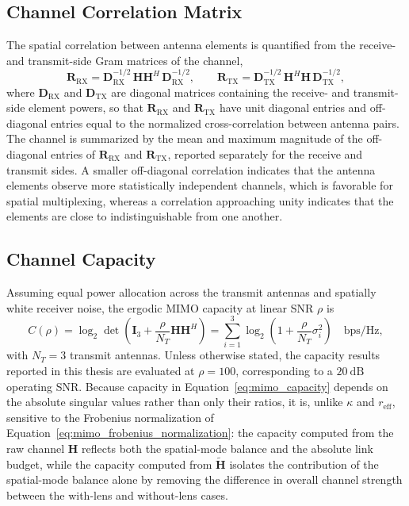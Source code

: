 \subsection{Channel Correlation Matrix}
The spatial correlation between antenna elements is quantified from the receive- and transmit-side Gram matrices of the channel,
\begin{equation}
    \mathbf{R}_{\mathrm{RX}} = \mathbf{D}_{\mathrm{RX}}^{-1/2}\,\mathbf{H}\mathbf{H}^{H}\,\mathbf{D}_{\mathrm{RX}}^{-1/2},
    \qquad
    \mathbf{R}_{\mathrm{TX}} = \mathbf{D}_{\mathrm{TX}}^{-1/2}\,\mathbf{H}^{H}\mathbf{H}\,\mathbf{D}_{\mathrm{TX}}^{-1/2},
    \label{eq:mimo_correlation_matrix}
\end{equation}
where $\mathbf{D}_{\mathrm{RX}}$ and $\mathbf{D}_{\mathrm{TX}}$ are diagonal matrices containing the receive- and transmit-side element powers, so that $\mathbf{R}_{\mathrm{RX}}$ and $\mathbf{R}_{\mathrm{TX}}$ have unit diagonal entries and off-diagonal entries equal to the normalized cross-correlation between antenna pairs. The channel is summarized by the mean and maximum magnitude of the off-diagonal entries of $\mathbf{R}_{\mathrm{RX}}$ and $\mathbf{R}_{\mathrm{TX}}$, reported separately for the receive and transmit sides. A smaller off-diagonal correlation indicates that the antenna elements observe more statistically independent channels, which is favorable for spatial multiplexing, whereas a correlation approaching unity indicates that the elements are close to indistinguishable from one another.

\subsection{Channel Capacity}
Assuming equal power allocation across the transmit antennas and spatially white receiver noise, the ergodic MIMO capacity at linear SNR $\rho$ is
\begin{equation}
    C(\rho) = \log_2\det\!\left(\mathbf{I}_{3} + \frac{\rho}{N_T}\mathbf{H}\mathbf{H}^{H}\right)
    = \sum_{i=1}^{3}\log_2\!\left(1+\frac{\rho}{N_T}\sigma_i^{2}\right)
    \quad\text{bps/Hz},
    \label{eq:mimo_capacity}
\end{equation}
with $N_T=3$ transmit antennas. Unless otherwise stated, the capacity results reported in this thesis are evaluated at $\rho=100$, corresponding to a $20~\mathrm{dB}$ operating SNR. Because capacity in Equation~\ref{eq:mimo_capacity} depends on the absolute singular values rather than only their ratios, it is, unlike $\kappa$ and $r_{\mathrm{eff}}$, sensitive to the Frobenius normalization of Equation~\ref{eq:mimo_frobenius_normalization}: the capacity computed from the raw channel $\mathbf{H}$ reflects both the spatial-mode balance and the absolute link budget, while the capacity computed from $\widetilde{\mathbf{H}}$ isolates the contribution of the spatial-mode balance alone by removing the difference in overall channel strength between the with-lens and without-lens cases.

